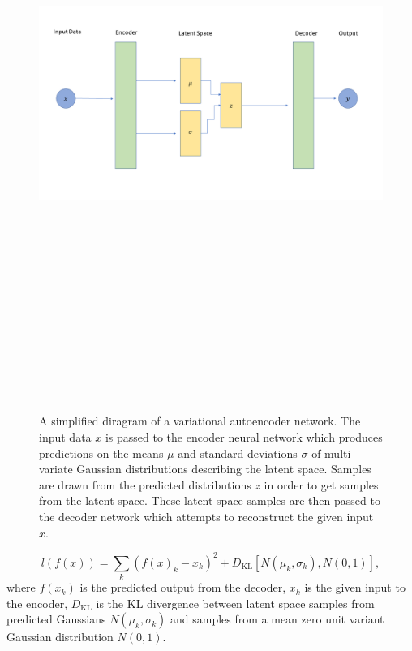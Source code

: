 \begin{figure}
    \centering
    \includegraphics[width=16cm,height=20cm,keepaspectratio]{figures/simple_vae_diagram.png}
    \caption[Simple variational autoencoder network illustration]{A simplified diragram of a variational autoencoder network. The input data $x$ is passed to the encoder neural network which produces predictions on the means $\mu$ and standard deviations $\sigma$ of multi-variate Gaussian distributions describing the latent space. Samples are drawn from the predicted distributions $z$ in order to get samples from the latent space. These latent space samples are then passed to the decoder network which attempts to reconstruct the given input $x$.}
    \label{fig:simple_vae}
\end{figure}
%
\begin{equation}
    l(f(x)) = \sum_k{ (f(x)_k - x_k)^2 + 
    D_{\textrm{KL}}[N(\mu_k, \sigma_k), N(0, 1)]},
\end{equation}
%
where $f(x_k)$ is the predicted output from the decoder, $x_k$
is the given input to the encoder, $D_{\textrm{KL}}$ is the \ac{KL} divergence 
between latent space samples from predicted Gaussians $N(\mu_k, \sigma_k)$ 
and samples from a mean zero unit variant Gaussian 
distribution $N(0,1)$. 

